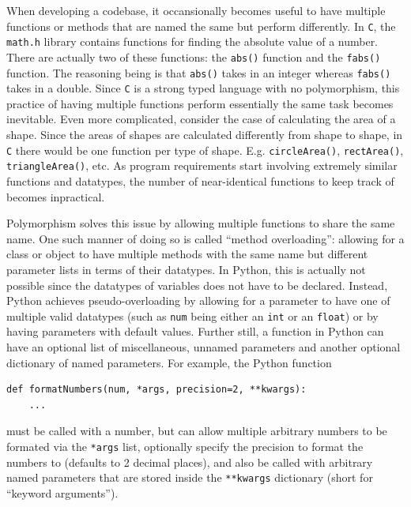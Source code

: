 \documentclass[11pt]{article}
\begin{document}
When developing a codebase, it occansionally becomes useful to have multiple functions or methods that are named the same but perform differently. In \texttt{C}, the \texttt{math.h} library contains functions for finding the absolute value of a number. There are actually two of these functions: the \texttt{abs()} function and the \texttt{fabs()} function. The reasoning being is that \texttt{abs()} takes in an integer whereas \texttt{fabs()} takes in a double. Since \texttt{C} is a strong typed language with no polymorphism, this practice of having multiple functions perform essentially the same task becomes inevitable. Even more complicated, consider the case of calculating the area of a shape. Since the areas of shapes are calculated differently from shape to shape, in \texttt{C} there would be one function per type of shape. E.g. \texttt{circleArea()}, \texttt{rectArea()}, \texttt{triangleArea()}, etc. As program requirements start involving extremely similar functions and datatypes, the number of near-identical functions to keep track of becomes inpractical.

Polymorphism solves this issue by allowing multiple functions to share the same name. One such manner of doing so is called ``method overloading'': allowing for a class or object to have multiple methods with the same name but different parameter lists in terms of their datatypes. In Python, this is actually not possible since the datatypes of variables does not have to be declared. Instead, Python achieves pseudo-overloading by allowing for a parameter to have one of multiple valid datatypes (such as \texttt{num} being either an \texttt{int} or an \texttt{float}) or by having parameters with default values. Further still, a function in Python can have an optional list of miscellaneous, unnamed parameters and another optional dictionary of named parameters. For example, the Python function

\begin{verbatim}
def formatNumbers(num, *args, precision=2, **kwargs):
    ...
\end{verbatim}

\noindent
must be called with a number, but can allow multiple arbitrary numbers to be formated via the \texttt{*args} list, optionally specify the precision to format the numbers to (defaults to 2 decimal places), and also be called with arbitrary named parameters that are stored inside the \texttt{**kwargs} dictionary (short for ``keyword arguments'').
\end{document}
